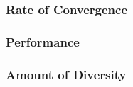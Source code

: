 
\subsubsection{Rate of Convergence}
\subsubsection{Performance}
\subsubsection{Amount of Diversity}
